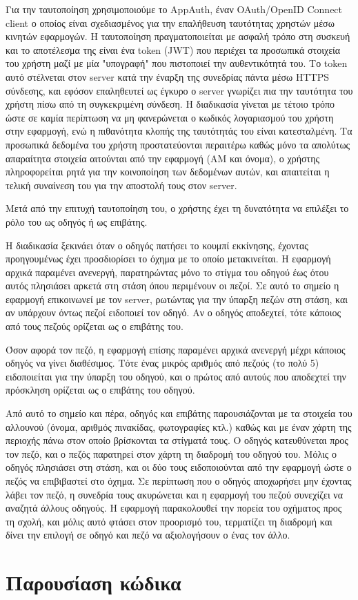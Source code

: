 \documentclass[../thesis.tex]{subfiles}
\begin{document}
Για την ταυτοποίηση χρησιμοποιούμε το AppAuth, έναν OAuth/OpenID Connect client ο οποίος είναι σχεδιασμένος για την επαλήθευση ταυτότητας χρηστών μέσω κινητών εφαρμογών.
Η ταυτοποίηση πραγματοποιείται με ασφαλή τρόπο στη συσκευή και το αποτέλεσμα της είναι ένα token (JWT) που περιέχει τα προσωπικά στοιχεία του χρήστη μαζί με μία "υπογραφή" που πιστοποιεί την αυθεντικότητά του.
Το token αυτό στέλνεται στον server κατά την έναρξη της συνεδρίας πάντα μέσω HTTPS σύνδεσης, και εφόσον επαληθευτεί ως έγκυρο ο server γνωρίζει πια την ταυτότητα του χρήστη πίσω από τη συγκεκριμένη σύνδεση.
Η διαδικασία γίνεται με τέτοιο τρόπο ώστε σε καμία περίπτωση να μη φανερώνεται ο κωδικός λογαριασμού του χρήστη στην εφαρμογή, ενώ η πιθανότητα κλοπής της ταυτότητάς του είναι κατεσταλμένη.
Τα προσωπικά δεδομένα του χρήστη προστατεύονται περαιτέρω καθώς μόνο τα απολύτως απαραίτητα στοιχεία αιτούνται από την εφαρμογή (ΑΜ και όνομα), ο χρήστης πληροφορείται ρητά για την κοινοποίηση των δεδομένων αυτών, και απαιτείται η τελική συναίνεση του για την αποστολή τους στον server.

Μετά από την επιτυχή ταυτοποίηση του, ο χρήστης έχει τη δυνατότητα να επιλέξει το ρόλο του ως οδηγός ή ως επιβάτης.

Η διαδικασία ξεκινάει όταν ο οδηγός πατήσει το κουμπί εκκίνησης, έχοντας προηγουμένως έχει προσδιορίσει το όχημα με το οποίο μετακινείται.
Η εφαρμογή αρχικά παραμένει ανενεργή, παρατηρώντας μόνο το στίγμα του οδηγού έως ότου αυτός πλησιάσει αρκετά στη στάση όπου περιμένουν οι πεζοί.
Σε αυτό το σημείο η εφαρμογή επικοινωνεί με τον server, ρωτώντας για την ύπαρξη πεζών στη στάση, και αν υπάρχουν όντως πεζοί ειδοποιεί τον οδηγό.
Αν ο οδηγός αποδεχτεί, τότε κάποιος από τους πεζούς ορίζεται ως ο επιβάτης του.

Όσον αφορά τον πεζό, η εφαρμογή επίσης παραμένει αρχικά ανενεργή μέχρι κάποιος οδηγός να γίνει διαθέσιμος.
Τότε ένας μικρός αριθμός από πεζούς (το πολύ 5) ειδοποιείται για την ύπαρξη του οδηγού, και ο πρώτος από αυτούς που αποδεχτεί την πρόσκληση ορίζεται ως ο επιβάτης του οδηγού.

Από αυτό το σημείο και πέρα, οδηγός και επιβάτης παρουσιάζονται με τα στοιχεία του αλλουνού (όνομα, αριθμός πινακίδας, φωτογραφίες κτλ.) καθώς και με έναν χάρτη της περιοχής πάνω στον οποίο βρίσκονται τα στίγματά τους.
Ο οδηγός κατευθύνεται προς τον πεζό, και ο πεζός παρατηρεί στον χάρτη τη διαδρομή του οδηγού του.
Μόλις ο οδηγός πλησιάσει στη στάση, και οι δύο τους ειδοποιούνται από την εφαρμογή ώστε ο πεζός να επιβιβαστεί στο όχημα.
Σε περίπτωση που ο οδηγός αποχωρήσει μην έχοντας λάβει τον πεζό, η συνεδρία τους ακυρώνεται και η εφαρμογή του πεζού συνεχίζει να αναζητά άλλους οδηγούς.
Η εφαρμογή παρακολουθεί την πορεία του οχήματος προς τη σχολή, και μόλις αυτό φτάσει στον προορισμό του, τερματίζει τη διαδρομή και δίνει την επιλογή σε οδηγό και πεζό να αξιολογήσουν ο ένας τον άλλο.

\section*{Παρουσίαση κώδικα}

\end{document}
